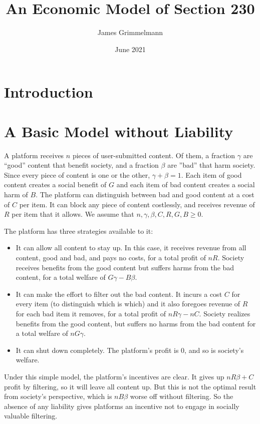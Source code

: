 \documentclass{article}
\title{An Economic Model of Section 230}
\author{James Grimmelmann}
\date{June 2021}
\begin{document}
\maketitle

\section{Introduction}


\section{A Basic Model without Liability}

A platform receives $n$ pieces of user-submitted content. Of them, a fraction $\gamma$ are ``good'' content that benefit society, and a fraction $\beta$ are ''bad'' that harm society. Since every piece of content is one or the other, $\gamma + \beta = 1$. Each item of good content creates a social benefit of $G$ and each item of bad content creates a social harm of $B$. The platform can distinguish between bad and good content at a cost of $C$ per item. It can block any piece of content costlessly, and receives revenue of $R$ per item that it allows. We assume that $n,\gamma, \beta, C,R,G,B \ge 0$.

The platform has three strategies available to it:

\begin{itemize}
    \item It can allow all content to stay up. In this case, it receives revenue from all content, good and bad, and pays no costs, for a total profit of $nR$. Society receives benefits from the good content but suffers harms from the bad content, for a total welfare of $G\gamma - B\beta$.
    \item It can make the effort to filter out the bad content. It incurs a cost $C$ for every item (to distinguish which is which) and it also foregoes revenue of $R$ for each bad item it removes, for a total profit of $nR\gamma - nC$. Society realizes benefits from the good content, but suffers no harms from the bad content for a total welfare of $nG\gamma$.
    \item It can shut down completely. The platform's profit is $0$, and so is society's welfare.
\end{itemize}

Under this simple model, the platform's incentives are clear. It gives up $nR\beta + C$ profit by filtering, so it will leave all content up. But this is not the optimal result from society's perspective, which is $nB\beta$ worse off without filtering. So the absence of any liability gives platforms an incentive not to engage in socially valuable filtering.
\end{document}
